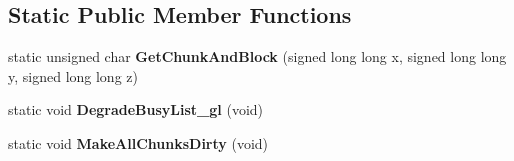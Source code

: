 \subsection*{\-Static \-Public \-Member \-Functions}
\begin{DoxyCompactItemize}
\item 
\hypertarget{structchunk_a93048b4b978fc47e6acdf0d282079b54}{static unsigned char {\bfseries \-Get\-Chunk\-And\-Block} (signed long long x, signed long long y, signed long long z)}\label{structchunk_a93048b4b978fc47e6acdf0d282079b54}

\item 
\hypertarget{structchunk_ad9de52aea314015991ef7eb30a572411}{static void {\bfseries \-Degrade\-Busy\-List\-\_\-gl} (void)}\label{structchunk_ad9de52aea314015991ef7eb30a572411}

\item 
\hypertarget{structchunk_a3f14f4b5cfa34a8be715aa5b3a44cee0}{static void {\bfseries \-Make\-All\-Chunks\-Dirty} (void)}\label{structchunk_a3f14f4b5cfa34a8be715aa5b3a44cee0}

\end{DoxyCompactItemize}
